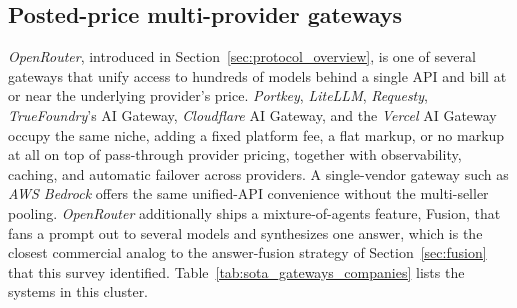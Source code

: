 \subsection{Posted-price multi-provider gateways}
\label{sec:sota_gateways}

\emph{OpenRouter}, introduced in Section~\ref{sec:protocol_overview}, is one of
several gateways that unify access to hundreds of models behind a single
API and bill at or near the underlying provider's price. \emph{Portkey},
\emph{LiteLLM}, \emph{Requesty}, \emph{TrueFoundry}'s AI Gateway, \emph{Cloudflare}
AI Gateway, and the \emph{Vercel} AI Gateway occupy the same niche, adding a
fixed platform fee, a flat markup, or no markup at all on top of
pass-through provider pricing, together with observability, caching, and
automatic failover across providers. A single-vendor gateway such as
\emph{AWS Bedrock} offers the same unified-API convenience without the
multi-seller pooling. \emph{OpenRouter} additionally ships a
mixture-of-agents feature, Fusion, that fans a prompt out to several
models and synthesizes one answer, which is the closest commercial
analog to the answer-fusion strategy of Section~\ref{sec:fusion} that
this survey identified.
Table~\ref{tab:sota_gateways_companies} lists the systems in this cluster.

